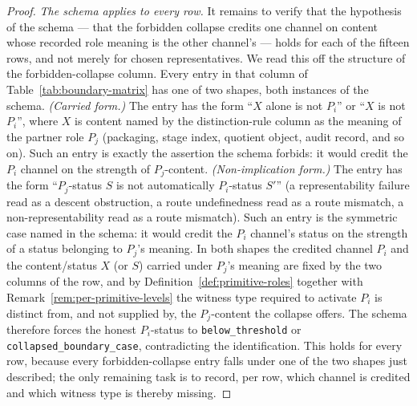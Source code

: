 \documentclass[11pt]{article}
\theoremstyle{definition}
\newcommand{\belowthr}{\texttt{below\_threshold}}
\newcommand{\collapsedbc}{\texttt{collapsed\_boundary\_case}}
\begin{document}
\begin{proof}
\emph{The schema applies to every row.} It remains to verify that the
hypothesis of the schema --- that the forbidden collapse credits one channel on
content whose recorded role meaning is the other channel's --- holds for each of
the fifteen rows, and not merely for chosen representatives. We read this off
the structure of the forbidden-collapse column. Every entry in that column of
Table~\ref{tab:boundary-matrix} has one of two shapes, both instances of the
schema. \emph{(Carried form.)} The entry has the form ``\(X\) alone is not
\(P_i\)'' or ``\(X\) is not \(P_i\)'', where \(X\) is content named by the
distinction-rule column as the meaning of the partner role \(P_j\) (packaging,
stage index, quotient object, audit record, and so on). Such an entry is exactly
the assertion the schema forbids: it would credit the \(P_i\) channel on the
strength of \(P_j\)-content. \emph{(Non-implication form.)} The entry has the
form ``\(P_j\)-status \(S\) is not automatically \(P_i\)-status \(S'\)'' (a
representability failure read as a descent obstruction, a route
undefinedness read as a route mismatch, a non-representability read as a route
mismatch). Such an entry is the symmetric case named in the schema: it would
credit the \(P_i\) channel's status on the strength of a status belonging to
\(P_j\)'s meaning. In both shapes the credited channel \(P_i\) and the
content/status \(X\) (or \(S\)) carried under \(P_j\)'s meaning are fixed by the
two columns of the row, and by
Definition~\ref{def:primitive-roles} together with
Remark~\ref{rem:per-primitive-levels} the witness type required to activate
\(P_i\) is distinct from, and not supplied by, the \(P_j\)-content the collapse
offers. The schema therefore forces the honest \(P_i\)-status to \belowthr{} or
\collapsedbc{}, contradicting the identification. This holds for every row,
because every forbidden-collapse entry falls under one of the two shapes just
described; the only remaining task is to record, per row, which channel is
credited and which witness type is thereby missing.


\end{proof}
\end{document}
